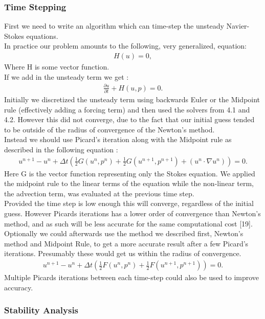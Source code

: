 \documentclass[11pt,twoside,a4paper]{article}
\begin{document}
\subsubsection{Time Stepping}
First we need to write an algorithm which can time-step the unsteady Navier-Stokes equations.\\
In practice our problem amounts to the following, very generalized, equation:
\begin{align*}
H(u) = 0 ,
\end{align*}
Where H is some vector function.\\
If we add in the unsteady term we get :
\begin{align}
\frac{\partial u}{\partial t} + H(u,p) = 0.
\end{align}
Initially we discretized the unsteady term using backwards Euler or the Midpoint rule (effectively adding a forcing term) and then used the solvers from 4.1 and 4.2. However this did not converge, due to the fact that our initial guess tended to be outside of the radius of convergence of the Newton's method.\\
Instead we should use Picard's iteration along with the Midpoint rule as described in the following equation :
\begin{align}
u^{n+1} - u^n + \Delta t (\frac{1}{2}G(u^n,p^n) + \frac{1}{2} G(u^{n+1},p^{n+1}) + ( u^n \cdot \nabla u^n) ) = 0 .
\end{align}
Here G is the vector function representing only the Stokes equation. We applied the midpoint rule to the linear terms of the equation while the non-linear term, the advection term, was evaluated at the previous time step.\\
Provided the time step is low enough this will converge, regardless of the initial guess. However Picards iterations has a lower order of convergence than Newton's method, and as such will be less accurate for the same computational cost [19].\\
Optionally we could afterwards use the method we described first, Newton's method and Midpoint Rule, to get a more accurate result after a few Picard's iterations. Presumably these would get us within the radius of convergence.
\begin{align}
u^{n+1} - u^n + \Delta t (\frac{1}{2}F(u^n,p^n) + \frac{1}{2} F(u^{n+1},p^{n+1})) = 0 .
\end{align}
Multiple Picards iterations between each time-step could also be used to improve accuracy.

\subsubsection{Stability Analysis}
\end{document}
